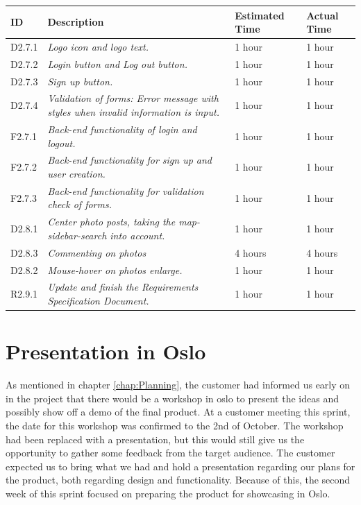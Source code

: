 \begin{minipage}{\linewidth}
\setlength{\tabcolsep}{12pt}
\centering
{}
\begin{tabular}{|p{1cm}|p{4cm}|p{2cm}|p{2cm}|}
\hline
\cellcolor{gray!25} ID & \cellcolor{gray!25} Description & \cellcolor{gray!25} Estimated Time & \cellcolor{gray!25} Actual Time \\
\hline
D2.7.1 & \it{Logo icon and logo text.} & 1 hour & 1 hour \\
D2.7.2 & \it{Login button and Log out button.} & 1 hour & 1 hour \\
D2.7.3 & \it{Sign up button.} & 1 hour & 1 hour \\
D2.7.4 & \it{Validation of forms: Error message with styles when invalid information is input.} & 1 hour & 1 hour \\
F2.7.1 & \it{Back-end functionality of login and logout.} & 1 hour & 1 hour \\
F2.7.2 & \it{Back-end functionality for sign up and user creation.} & 1 hour & 1 hour \\
F2.7.3 & \it{Back-end functionality for validation check of forms.} & 1 hour & 1 hour \\
D2.8.1 & \it{Center photo posts, taking the map-sidebar-search into account.} & 1 hour & 1 hour \\
D2.8.3 & \it{Commenting on photos} & 4 hours & 4 hours \\
D2.8.2 & \it{Mouse-hover on photos enlarge.} & 1 hour & 1 hour \\
R2.9.1 & \it{Update and finish the Requirements Specification Document.} & 1 hour & 1 hour \\
\hline
\end{tabular}
\end{minipage}

\section{Presentation in Oslo}
\label{sec:S2Presentation}

As mentioned in chapter \ref{chap:Planning}, the customer had informed us early on in the project that there would be a workshop in oslo to present the ideas and possibly show off a demo of the final product. At a customer meeting this sprint, the date for this workshop was confirmed to the 2nd of October. The workshop had been replaced with a presentation, but this would still give us the opportunity to gather some feedback from the target audience. The customer expected us to bring what we had and hold a presentation regarding our plans for the product, both regarding design and functionality. Because of this, the second week of this sprint focused on preparing the product for showcasing in Oslo.

